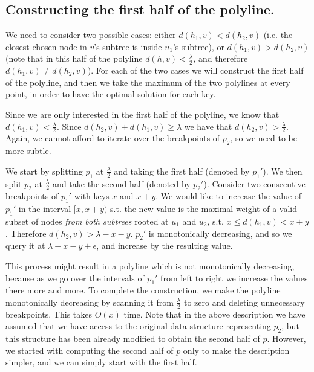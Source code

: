 \documentclass[a4paper,UKenglish]{lipics-v2016}
\theoremstyle{plain}
\begin{document}

\subsection{Constructing the first half of the polyline.} We need to consider two possible cases: either $d(h_1,v) < d(h_2,v)$ (i.e. the closest chosen node in $v$'s subtree is inside $u_1$'s subtree), or $d(h_1,v) > d(h_2,v)$ (note that in this half of the polyline $d(h,v)<\frac{\lambda}{2}$, and therefore $d(h_1,v) \neq d(h_2,v)$). For each of the two cases we will construct the first half of the polyline, and then we take the maximum of the two polylines at every point, in order to have the optimal solution for each key.

\medskip {} Since we are only interested in the first half of the polyline, we know that $d(h_1,v) < \frac{\lambda}{2}$. Since $d(h_2,v) +d(h_1,v)\geq \lambda$ we have that  $d(h_2,v) > \frac{\lambda}{2}$. Again, we cannot afford to iterate over the breakpoints of $p_2$, so we need to be more subtle.

We start by splitting $p_1$ at $\frac{\lambda}{2}$ and taking the first half (denoted by $p_1'$). We then split $p_2$ at $\frac{\lambda}{2}$ and take the second half (denoted by $p_2'$). Consider two consecutive breakpoints of $p_1'$ with keys $x$ and $x+y$. We would like to increase the value of $p_1'$ in the interval $[x,x+y)$ s.t. the new value is the maximal weight of a valid subset of nodes \emph{from both subtrees} rooted at $u_1$ and $u_2$, s.t. $x \leq d(h_1,v)<x+y$. Therefore $d(h_2,v)>\lambda-x-y$. $p_2'$ is monotonically decreasing, and so we query it at $\lambda-x-y+\epsilon$, and increase by the resulting value.

This process might result in a polyline which is not monotonically decreasing, because as we go over the intervals of $p_1'$ from left to right we increase the values there more and more.
To complete the construction, we make the polyline monotonically decreasing by scanning it from $\frac{\lambda}{2}$ to zero and deleting unnecessary breakpoints. This takes $O(x)$ time.
Note that in the above description we have assumed that we have access to the original data structure representing $p_{2}$, but this structure has been already modified to obtain the second half of $p$. However, we started with computing the second half of $p$ only to make the description simpler, and we can simply start with the first half.
\end{document}
